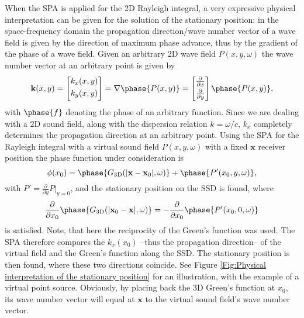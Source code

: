 \documentclass[12pt,a4paper]{article}
\newcommand{\vx}{\mathbf{x}}
\newcommand{\vxo}{\mathbf{x}_0}
\begin{document}
When the SPA is applied for the 2D Rayleigh integral, a very expressive physical interpretation can be given for the solution of the stationary position:
in the space-frequency domain the propagation direction/wave number vector of a wave field is given by the direction of maximum phase advance, thus by the gradient of the phase of a wave field. Given an arbitrary 2D wave field $P(x,y,\omega)$ the wave number vector at an arbitrary point is given by
\begin{equation}
\mathbf{k}(x,y) = \begin{bmatrix} k_x(x,y) \\[0.3em] k_y(x,y)\\[0.3em]    \end{bmatrix} = \nabla \phase{P(x,y)} = \begin{bmatrix} \frac{\partial}{\partial x} \\[0.3em] \frac{\partial}{\partial y}\\[0.3em] \end{bmatrix}   \phase{P(x,y)},
\end{equation}
with $\phase{f}$ denoting the phase of an arbitrary function.
Since we are dealing with a 2D sound field, along with the dispersion relation $k = \omega/c$, $k_x$ completely determines the propagation direction at an arbitrary point.
Using the SPA for the Rayleigh integral with a virtual sound field $P(x,y,\omega)$ with a fixed $\vx$ receiver position the phase function under consideration is 
\begin{equation}
\phi(x_0) =  \phase{G_{\mathrm{3D}}(|\vx-\vxo|,\omega)} + \phase{ P'(x_0,y,\omega)},
\end{equation}
with $P' =  \frac{\partial}{\partial y}P|_{y = 0} $,
and the stationary position on the SSD is found, where 
\begin{equation}
\frac{ \partial }{\partial x_0} \phase{G_{\mathrm{3D}}(|\vxo-\vx|,\omega)} = - \frac{ \partial }{\partial x_0} \phase{ P'(x_0,0,\omega) }
\end{equation}
is satisfied. Note, that here the reciprocity of the Green's function was used. The SPA therefore compares the $k_x(x_0)$ --thus the propagation direction-- of the virtual field and the Green's function along the SSD. The stationary position is then found, where these two directions coincide. See Figure \ref{Fig:Physical interpretation of the stationary position} for an illustration, with the example of a virtual point source. Obviously, by placing back the 3D Green's function at $x_0$, its wave number vector will equal at $\vx$ to the virtual sound field's wave number vector. 
\end{document}
